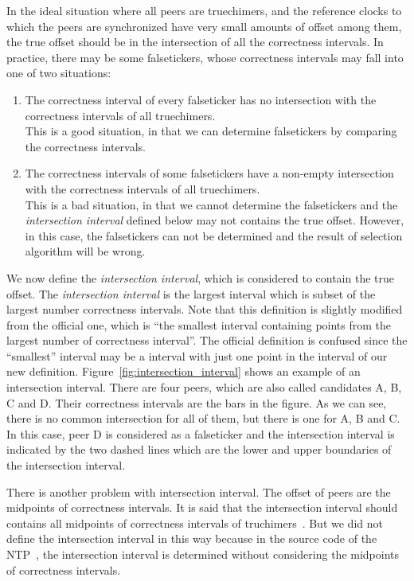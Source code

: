 In the ideal situation where all peers are truechimers, and the reference clocks
to which the peers are synchronized have very small amounts of offset among them,
the true offset should be in the intersection of all the correctness intervals. In
practice, there may be some falsetickers, whose correctness intervals may fall
into one of 
two situations:
\begin{enumerate}
    \item The correctness interval of every falseticker has no intersection
        with the correctness intervals of all truechimers.\\ 
        This is a good situation, in that we can determine falsetickers by
        comparing the correctness intervals.
    \item The correctness intervals of some falsetickers have a non-empty
        intersection with the correctness intervals of all truechimers.\\ 
        This is a bad situation, in that we cannot determine the falsetickers and
        the \emph{intersection interval} defined below may not contains the
        true offset. However, in this case, the falsetickers can not be
        determined and the result of selection algorithm will be wrong.
\end{enumerate}

We now define the \emph{intersection interval}, which is considered to contain
the true offset. The \emph{intersection interval} is the largest interval
which is subset of the largest number correctness intervals. Note that this
definition is slightly modified from the official one, which is ``the smallest
interval containing points from the largest number of correctness
interval''\cite{clock_selection}. The official definition is confused since the
``smallest'' interval may be a interval with just one point in the interval of
our new definition.
Figure~\ref{fig:intersection_interval} shows an example of an intersection
interval. There are four peers, which are also called candidates A, B, C and
D\null. Their correctness intervals are the bars in the figure. As we can see,
there is no common intersection for all of them, but there is one for A, B
and C\null. In this case, peer D is considered as a falseticker and the
intersection interval is indicated by the two dashed lines which are the lower
and upper boundaries of the intersection interval.



There is another problem with intersection interval. The offset of peers are
the midpoints of correctness intervals. It is said that the intersection
interval should contains all midpoints of correctness intervals of
truchimers~\cite{redbook}. But we did not define the intersection interval in
this way because in the source code of the NTP~\cite{source_code}, the
intersection interval is determined without considering the midpoints of
correctness intervals.

